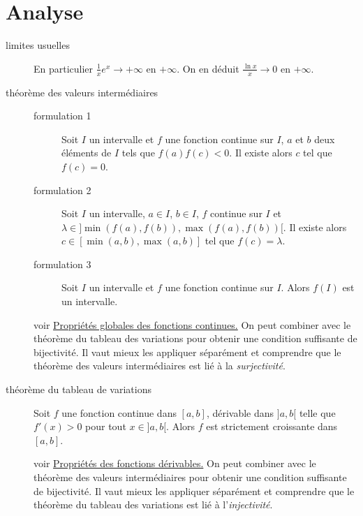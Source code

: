 \begin{description}
\end{description}


\section{Analyse}
\begin{description}
 \item[limites usuelles] 
En particulier $\frac{1}{x}e^x\rightarrow +\infty$ en $+\infty$. On en déduit $\frac{\ln x}{x}\rightarrow 0$ en $+\infty$. 

\item[théorème des valeurs intermédiaires] 
\begin{thm}
 \begin{description}
  \item[formulation 1]Soit $I$ un intervalle et $f$ une fonction continue sur $I$, $a$ et $b$ deux éléments de $I$ tels que $f(a)f(c)<0$. Il existe alors $c$ tel que $f(c)=0$.
  \item[formulation 2]Soit $I$ un intervalle, $a\in I$, $b\in I$, $f$ continue sur $I$ et $\lambda \in ]\min(f(a),f(b)),\max(f(a),f(b))[$. Il existe alors $c\in[\min(a,b),\max(a,b)]$ tel que $f(c)=\lambda$.
  \item[formulation 3]Soit $I$ un intervalle et $f$ une fonction continue sur $I$. Alors $f(I)$ est un intervalle.
 \end{description}
\end{thm}
voir \href{\baseurl C2072.pdf}{Propriétés globales des fonctions continues.}\newline
On peut combiner avec le théorème du tableau des variations pour obtenir une condition suffisante de bijectivité. Il vaut mieux les appliquer séparément et comprendre que le théorème des valeurs intermédiaires est lié à la \emph{surjectivité}. 

\item[théorème du tableau de variations] 
\begin{prop}
 Soit $f$ une fonction continue dans $[a,b]$, dérivable dans $]a,b[$ telle que $f'(x)>0$ pour tout $x\in]a,b[$. Alors $f$ est strictement croissante dans $[a,b]$.
\end{prop}
voir \href{\baseurl C2070.pdf}{Propriétés des fonctions dérivables.}
On peut combiner avec le théorème des valeurs intermédiaires pour obtenir une condition suffisante de bijectivité. Il vaut mieux les appliquer séparément et comprendre que le théorème du tableau des variations est lié à l'\emph{injectivité}. 


\end{description}
